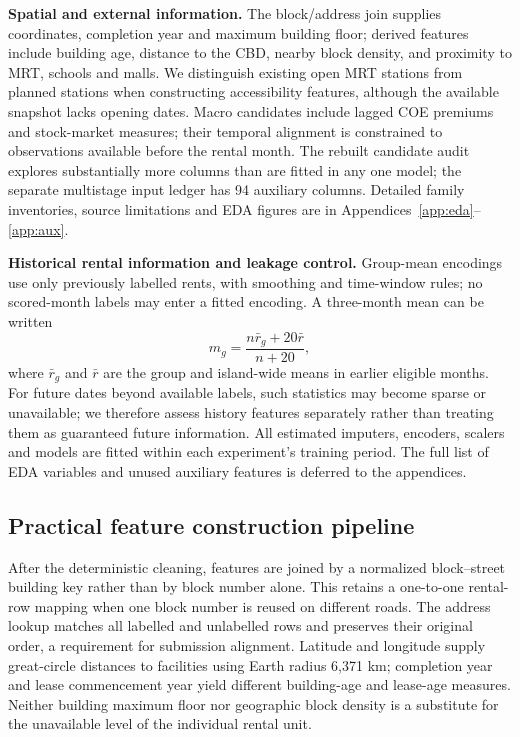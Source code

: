 \documentclass[10pt,a4paper]{article}
\begin{document}
\textbf{Spatial and external information.} The block/address join supplies coordinates, completion year and maximum building floor; derived features include building age, distance to the CBD, nearby block density, and proximity to MRT, schools and malls. We distinguish existing open MRT stations from planned stations when constructing accessibility features, although the available snapshot lacks opening dates. Macro candidates include lagged COE premiums and stock-market measures; their temporal alignment is constrained to observations available before the rental month. The rebuilt candidate audit explores substantially more columns than are fitted in any one model; the separate multistage input ledger has 94 auxiliary columns. Detailed family inventories, source limitations and EDA figures are in Appendices~\ref{app:eda}--\ref{app:aux}.

\textbf{Historical rental information and leakage control.} Group-mean encodings use only previously labelled rents, with smoothing and time-window rules; no scored-month labels may enter a fitted encoding. A three-month mean can be written
\begin{equation}\label{eq:shrinkmain}m_g=\frac{n\bar r_g+20\bar r}{n+20},\end{equation}
where $\bar r_g$ and $\bar r$ are the group and island-wide means in earlier eligible months. For future dates beyond available labels, such statistics may become sparse or unavailable; we therefore assess history features separately rather than treating them as guaranteed future information. All estimated imputers, encoders, scalers and models are fitted within each experiment's training period. The full list of EDA variables and unused auxiliary features is deferred to the appendices.


\subsection{Practical feature construction pipeline}
After the deterministic cleaning, features are joined by a normalized block--street building key rather than by block number alone. This retains a one-to-one rental-row mapping when one block number is reused on different roads. The address lookup matches all labelled and unlabelled rows and preserves their original order, a requirement for submission alignment. Latitude and longitude supply great-circle distances to facilities using Earth radius 6,371 km; completion year and lease commencement year yield different building-age and lease-age measures. Neither building maximum floor nor geographic block density is a substitute for the unavailable level of the individual rental unit.
\end{document}

